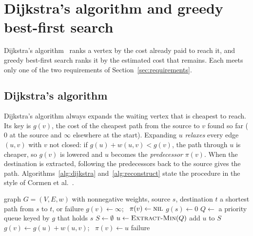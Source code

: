 \section{Dijkstra's algorithm and greedy best-first search}
\label{sec:predecessors}

Dijkstra's algorithm~\cite{dijkstra1959} ranks a vertex by the cost already
paid to reach it, and greedy best-first search ranks it by the estimated cost
that remains. Each meets only one of the two requirements of
Section~\ref{sec:requirements}.

\subsection{Dijkstra's algorithm}\label{sec:dijkstra}

Dijkstra's algorithm always expands the waiting vertex that is cheapest to
reach. Its key is $g(v)$, the cost of the cheapest path from the source to $v$
found so far ($0$ at the source and $\infty$ elsewhere at the start). Expanding
$u$ \emph{relaxes} every edge $(u,v)$ with $v$ not closed: if
$g(u) + w(u,v) < g(v)$, the path through $u$ is cheaper, so $g(v)$ is lowered
and $u$ becomes the \emph{predecessor} $\pi(v)$. When the destination is
extracted, following the predecessors back to the source gives the path.
Algorithms~\ref{alg:dijkstra} and~\ref{alg:reconstruct} state the procedure in
the style of Cormen et al.~\cite{cormen2022clrs}.

\begin{algorithm}[htbp]
  \caption{Dijkstra's algorithm}\label{alg:dijkstra}
  \begin{algorithmic}[1]
    \Require graph $G = (V,E,w)$ with nonnegative weights, source $s$, destination $t$
    \Ensure a shortest path from $s$ to $t$, or failure
        \State $g(v) \gets \infty$; \ $\pi(v) \gets \textsc{nil}$
      \EndFor
      \State $g(s) \gets 0$
      \State $Q \gets$ a priority queue keyed by $g$ that holds $s$
      \State $S \gets \emptyset$
        \State $u \gets \Call{Extract-Min}{Q}$
          \State \Return {}
        \EndIf
        \State add $u$ to $S$
            \State $g(v) \gets g(u) + w(u,v)$; \ $\pi(v) \gets u$
            \State {}
          \EndIf
        \EndFor
      \EndWhile
      \State \Return failure 
    \EndProcedure
  \end{algorithmic}
\end{algorithm}


